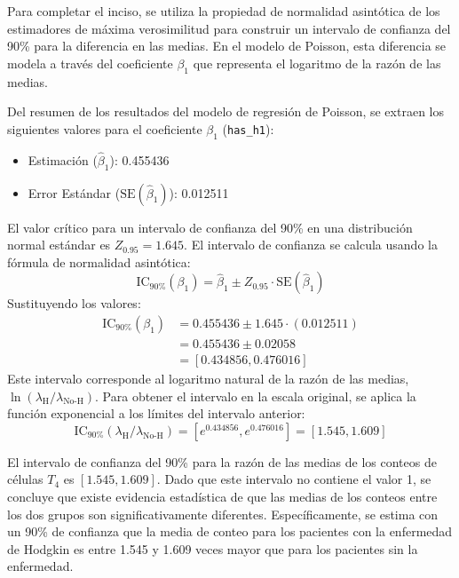\documentclass[paper=letter, fontsize=11pt]{scrartcl}\usepackage[]{graphicx}\usepackage[]{xcolor}
\numberwithin{equation}{problemcounter} %
\numberwithin{figure}{problemcounter} %
\numberwithin{table}{problemcounter} %
\numberwithin{subsection}{problemcounter}
\begin{document}
Para completar el inciso, se utiliza la propiedad de normalidad asintótica de los estimadores de máxima verosimilitud para construir un intervalo de confianza del 90\% para la diferencia en las medias. En el modelo de Poisson, esta diferencia se modela a través del coeficiente $\beta_1$ que representa el logaritmo de la razón de las medias.

Del resumen de los resultados del modelo de regresión de Poisson, se extraen los siguientes valores para el coeficiente $\beta_1$ (\texttt{has\_h1}):
\begin{itemize}
    \item Estimación ($\hat{\beta}_1$): 0.455436
    \item Error Estándar ($\text{SE}(\hat{\beta}_1)$): 0.012511
\end{itemize}
El valor crítico para un intervalo de confianza del 90\% en una distribución normal estándar es $Z_{0.95} = 1.645$. El intervalo de confianza se calcula usando la fórmula de normalidad asintótica:
$$
\text{IC}_{90\%}(\beta_1) = \hat{\beta}_1 \pm Z_{0.95} \cdot \text{SE}(\hat{\beta}_1)
$$
Sustituyendo los valores:
\begin{align*}
\text{IC}_{90\%}(\beta_1) &= 0.455436 \pm 1.645 \cdot (0.012511) \\
&= 0.455436 \pm 0.02058 \\
&= [0.434856, 0.476016]
\end{align*}
Este intervalo corresponde al logaritmo natural de la razón de las medias, $\ln(\lambda_{\text{H}} / \lambda_{\text{No-H}})$. Para obtener el intervalo en la escala original, se aplica la función exponencial a los límites del intervalo anterior:
$$
\text{IC}_{90\%}(\lambda_\text{H} / \lambda_{\text{No-H}}) = [e^{0.434856}, e^{0.476016}] = [1.545, 1.609]
$$

El intervalo de confianza del 90\% para la razón de las medias de los conteos de células $T_4$ es $[1.545, 1.609]$. Dado que este intervalo no contiene el valor 1, se concluye que existe evidencia estadística de que las medias de los conteos entre los dos grupos son significativamente diferentes. Específicamente, se estima con un 90\% de confianza que la media de conteo para los pacientes con la enfermedad de Hodgkin es entre 1.545 y 1.609 veces mayor que para los pacientes sin la enfermedad.


\newpage
\end{document}
